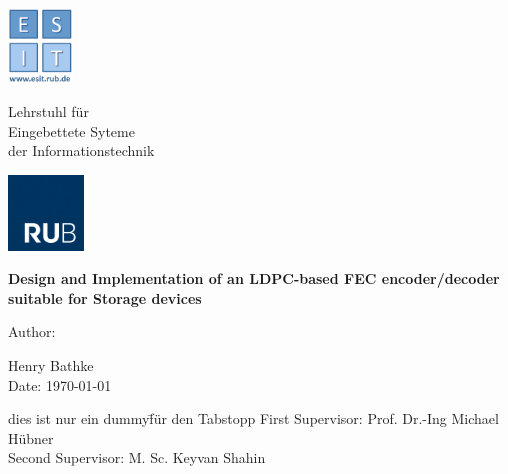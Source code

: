 
\begin{titlepage}
	\thispagestyle{empty}
	\begin{minipage}[b][2.5cm][r]{1.8cm}
	\centering
    \includegraphics[height=2cm, keepaspectratio]{Graphic/Logo.png}
	\end{minipage} \hspace{0.5mm}
	\begin{minipage}[b][2cm][l]{10cm}
		\vspace*{\fill}
		{Lehrstuhl für\\
		Eingebettete Syteme\\
		der Informationstechnik}
		\vspace*{\fill}
	\end{minipage} \hspace{5mm}
	\begin{minipage}[b][2.5cm][r]{2.5cm}
	\centering
    \includegraphics[height=2cm, keepaspectratio]{Graphic/RUB.png}
	\end{minipage}	
	
	
	\begin{center}
		\vspace{3cm}
		
		{\Large \textbf{Design and Implementation of an LDPC-based FEC encoder/decoder suitable for Storage devices}}
		
		\vspace{1cm}
		\vspace{1cm}
		{
			Author: \\
		}
		
		\vspace{1.5cm}
		{
			Henry Bathke \\
		}
		\vspace{1.5cm}
		Date: \today 
		\vspace{1.5cm}
		
		\begin{tabbing}
			dies ist nur ein dummy\= für den Tabstopp \kill
			First Supervisor: \> Prof. Dr.-Ing Michael Hübner \\
			Second Supervisor: \> M. Sc. Keyvan Shahin
		\end{tabbing}
		
	\end{center}


\end{titlepage}
